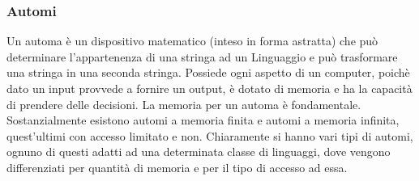 \documentclass[]{article}
\begin{document}
			\subsubsection{Automi}
				Un automa è un dispositivo matematico (inteso in forma astratta) che può determinare l'appartenenza di una stringa ad un Linguaggio e può trasformare una stringa in una seconda stringa. Possiede ogni aspetto di un computer, poichè dato un input provvede a fornire un output, è dotato di memoria e ha la capacità di prendere delle decisioni.
				\newline
				La memoria per un automa è fondamentale. Sostanzialmente esistono automi a memoria finita e automi a memoria infinita, quest'ultimi con accesso limitato e non.
				\newline Chiaramente si hanno vari tipi di automi, ognuno di questi adatti ad una determinata classe di linguaggi, dove vengono differenziati per quantità di memoria e per il tipo di accesso ad essa.
\end{document}
